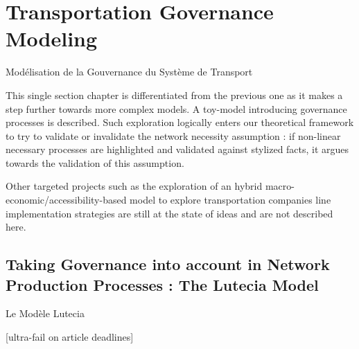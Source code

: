 




\chapter{Transportation Governance Modeling}{Modélisation de la Gouvernance du Système de Transport} %

\label{ch:lutetia} %



This single section chapter is differentiated from the previous one as it makes a step further towards more complex models. A toy-model introducing governance processes is described. Such exploration logically enters our theoretical framework to try to validate or invalidate the network necessity assumption : if non-linear necessary processes are highlighted and validated against stylized facts, it argues towards the validation of this assumption. 

Other targeted projects such as the exploration of an hybrid macro-economic/accessibility-based model to explore transportation companies line implementation strategies are still at the state of ideas and are not described here.





\section[The Lutecia Model]{Taking Governance into account in Network Production Processes : The Lutecia Model}{Le Modèle Lutecia}



[ultra-fail on article deadlines]












